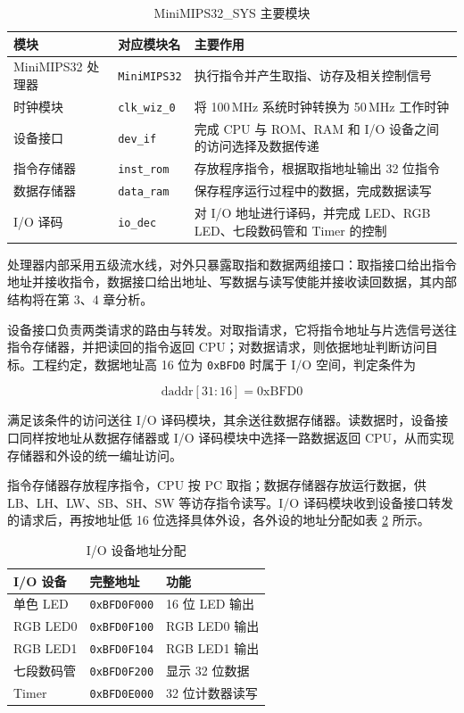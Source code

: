 \documentclass[UTF8,a4paper,12pt,fontset=none]{ctexart}
\numberwithin{figure}{section}
\numberwithin{table}{section}
\begin{document}
\begin{table}[H]
  \centering
  \caption{MiniMIPS32\_SYS 主要模块}
  \label{tab:sys-mods}
  \begin{tabularx}{\linewidth}{llX}
    \toprule
    模块 & 对应模块名 & 主要作用 \\
    \midrule
    MiniMIPS32 处理器 & \texttt{MiniMIPS32} & 执行指令并产生取指、访存及相关控制信号 \\
    时钟模块 & \texttt{clk\_wiz\_0} & 将 100\,MHz 系统时钟转换为 50\,MHz 工作时钟 \\
    设备接口 & \texttt{dev\_if} & 完成 CPU 与 ROM、RAM 和 I/O 设备之间的访问选择及数据传递 \\
    指令存储器 & \texttt{inst\_rom} & 存放程序指令，根据取指地址输出 32 位指令 \\
    数据存储器 & \texttt{data\_ram} & 保存程序运行过程中的数据，完成数据读写 \\
    I/O 译码 & \texttt{io\_dec} & 对 I/O 地址进行译码，并完成 LED、RGB LED、七段数码管和 Timer 的控制 \\
    \bottomrule
  \end{tabularx}
\end{table}

处理器内部采用五级流水线，对外只暴露取指和数据两组接口：取指接口给出指令地址并接收指令，数据接口给出地址、写数据与读写使能并接收读回数据，其内部结构将在第 3、4 章分析。

设备接口负责两类请求的路由与转发。对取指请求，它将指令地址与片选信号送往指令存储器，并把读回的指令返回 CPU；对数据请求，则依据地址判断访问目标。工程约定，数据地址高 16 位为 \texttt{0xBFD0} 时属于 I/O 空间，判定条件为

\[
\text{daddr}[31{:}16] = \text{0xBFD0}
\]

满足该条件的访问送往 I/O 译码模块，其余送往数据存储器。读数据时，设备接口同样按地址从数据存储器或 I/O 译码模块中选择一路数据返回 CPU，从而实现存储器和外设的统一编址访问。

指令存储器存放程序指令，CPU 按 PC 取指；数据存储器存放运行数据，供 LB、LH、LW、SB、SH、SW 等访存指令读写。I/O 译码模块收到设备接口转发的请求后，再按地址低 16 位选择具体外设，各外设的地址分配如表 \ref{tab:io-addr} 所示。

\begin{table}[H]
  \centering
  \caption{I/O 设备地址分配}
  \label{tab:io-addr}
  \begin{tabularx}{\linewidth}{llX}
    \toprule
    I/O 设备 & 完整地址 & 功能 \\
    \midrule
    单色 LED & \texttt{0xBFD0F000} & 16 位 LED 输出 \\
    RGB LED0 & \texttt{0xBFD0F100} & RGB LED0 输出 \\
    RGB LED1 & \texttt{0xBFD0F104} & RGB LED1 输出 \\
    七段数码管 & \texttt{0xBFD0F200} & 显示 32 位数据 \\
    Timer & \texttt{0xBFD0E000} & 32 位计数器读写 \\
    \bottomrule
  \end{tabularx}
\end{table}
\end{document}

